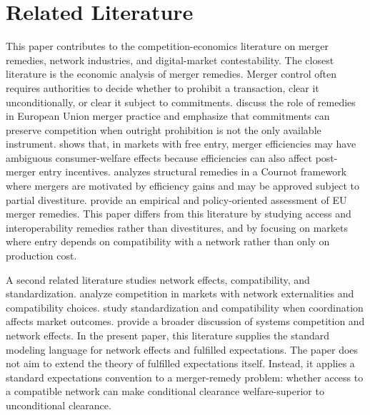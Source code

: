 \documentclass[12pt]{article}
\begin{document}
\section{Related Literature}\label{sec:literature}

This paper contributes to the competition-economics literature on merger remedies, network industries, and digital-market contestability. The closest literature is the economic analysis of merger remedies. Merger control often requires authorities to decide whether to prohibit a transaction, clear it unconditionally, or clear it subject to commitments. \citet{MottaPoloVasconcelos2007} discuss the role of remedies in European Union merger practice and emphasize that commitments can preserve competition when outright prohibition is not the only available instrument. \citet{Cabral2003} shows that, in markets with free entry, merger efficiencies may have ambiguous consumer-welfare effects because efficiencies can also affect post-merger entry incentives. \citet{Vasconcelos2010} analyzes structural remedies in a Cournot framework where mergers are motivated by efficiency gains and may be approved subject to partial divestiture. \citet{DaviesLyons2007} provide an empirical and policy-oriented assessment of EU merger remedies. This paper differs from this literature by studying access and interoperability remedies rather than divestitures, and by focusing on markets where entry depends on compatibility with a network rather than only on production cost.

A second related literature studies network effects, compatibility, and standardization. \citet{KatzShapiro1985} analyze competition in markets with network externalities and compatibility choices. \citet{FarrellSaloner1985} study standardization and compatibility when coordination affects market outcomes. \citet{KatzShapiro1994} provide a broader discussion of systems competition and network effects. In the present paper, this literature supplies the standard modeling language for network effects and fulfilled expectations. The paper does not aim to extend the theory of fulfilled expectations itself. Instead, it applies a standard expectations convention to a merger-remedy problem: whether access to a compatible network can make conditional clearance welfare-superior to unconditional clearance.
\end{document}
